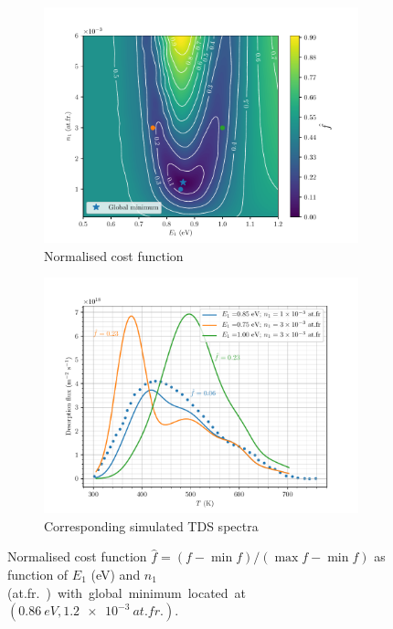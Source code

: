 \begin{figure} [h!]
    \centering
        \begin{subfigure}[t]{0.7\linewidth}
            \centering
            \includegraphics[width=\linewidth]{Figures/Chapter3/Parametric_optimisation/cost_function_2D.pdf}
            \caption{Normalised cost function}
            \label{fig:2D}
        \end{subfigure}
        \begin{subfigure}[t]{0.7\linewidth}
            \centering
            \includegraphics[width=\linewidth]{Figures/Chapter3/Parametric_optimisation/points_on_cost_function.pdf}
            \caption{Corresponding simulated TDS spectra}
            \label{fig:corresponding spectra}
        \end{subfigure}%
    \caption{Normalised cost function $\hat{f} = (f - \min{f})/(\max{f}-\min{f})$ as function of $E_1$ (\si{eV}) and $n_1$ (\si{at.fr.}) with global minimum located at $(\SI{0.86}{eV}, \SI{1.2e-3}{at.fr.})$.}
    \label{fig:cost function}
\end{figure}

